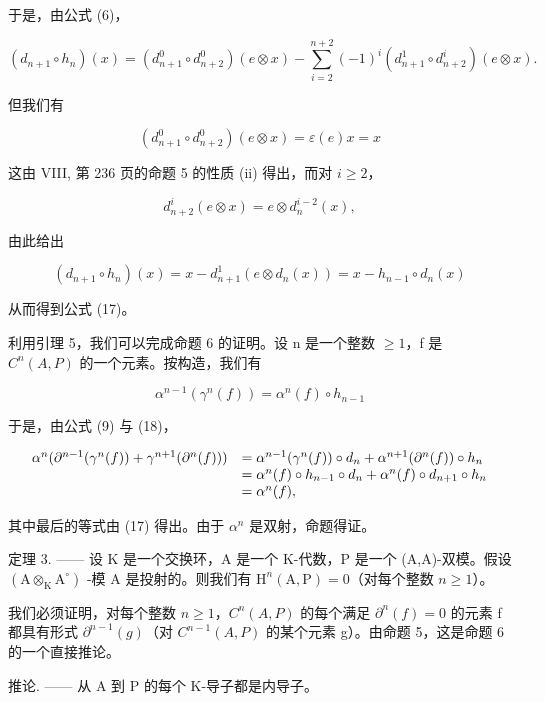 于是，由公式 (6)，

\[
(d _ {n + 1} \circ h _ {n}) (x) = (d _ {n + 1} ^ {0} \circ d _ {n + 2} ^ {0}) (e \otimes x) - \sum_ {i = 2} ^ {n + 2} (- 1) ^ {i} (d _ {n + 1} ^ {1} \circ d _ {n + 2} ^ {i}) (e \otimes x).
\]

但我们有

\[
(d _ {n + 1} ^ {0} \circ d _ {n + 2} ^ {0}) (e \otimes x) = \varepsilon (e) x = x
\]

这由 VIII, 第 236 页的命题 5 的性质 (ii) 得出，而对 \(i \geqslant 2\)，

\[
d _ {n + 2} ^ {i} (e \otimes x) = e \otimes d _ {n} ^ {i - 2} (x),
\]

由此给出

\[
(d _ {n + 1} \circ h _ {n}) (x) = x - d _ {n + 1} ^ {1} (e \otimes d _ {n} (x)) = x - h _ {n - 1} \circ d _ {n} (x)
\]

从而得到公式 (17)。

利用引理 5，我们可以完成命题 6 的证明。设 n 是一个整数 \(\geqslant 1\)，f 是 \(C^{n}(A,P)\) 的一个元素。按构造，我们有

\[
\alpha^ {n - 1} (\gamma^ {n} (f)) = \alpha^ {n} (f) \circ h _ {n - 1}\tag{18}
\]

于是，由公式 (9) 与 (18)，

\[
\begin{array}{r l} \alpha^ {n} (\partial^ {n - 1} (\gamma^ {n} (f)) + \gamma^ {n + 1} (\partial^ {n} (f))) & = \alpha^ {n - 1} (\gamma^ {n} (f)) \circ d _ {n} + \alpha^ {n + 1} (\partial^ {n} (f)) \circ h _ {n} \\ & = \alpha^ {n} (f) \circ h _ {n - 1} \circ d _ {n} + \alpha^ {n} (f) \circ d _ {n + 1} \circ h _ {n} \\ & = \alpha^ {n} (f), \end{array}
\]

其中最后的等式由 (17) 得出。由于 \(\alpha^{n}\) 是双射，命题得证。

定理 3. —— 设 K 是一个交换环，A 是一个 K-代数，P 是一个 (A,A)-双模。假设 \((\mathrm{A}\otimes_{\mathrm{K}}\mathrm{A}^{\circ})\) -模 A 是投射的。则我们有 \(\mathrm{H}^{n}(\mathrm{A},\mathrm{P})=0\)（对每个整数 \(n\geqslant1\)）。

我们必须证明，对每个整数 \(n \geqslant 1\)，\(C^{n}(A, P)\) 的每个满足 \(\partial^{n}(f) = 0\) 的元素 f 都具有形式 \(\partial^{n-1}(g)\)（对 \(C^{n-1}(A, P)\) 的某个元素 g）。由命题 5，这是命题 6 的一个直接推论。

推论. —— 从 A 到 P 的每个 K-导子都是内导子。

